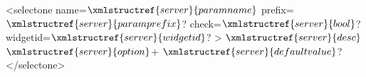 <selectone name=$\xmlstructref{server}{paramname}$ prefix=$\xmlstructref{server}{paramprefix}$? check=$\xmlstructref{server}{bool}$? widgetid=$\xmlstructref{server}{widgetid}$? >
  $\xmlstructref{server}{desc}$
  $\xmlstructref{server}{option}$+
  $\xmlstructref{server}{defaultvalue}$?
</selectone>
